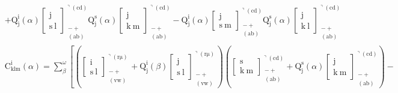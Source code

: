\documentclass[12pt]{article}
\begin{document}
\begin{itemize}
\begin{equation}
\begin{aligned}
    & + \mathrm{Q}^{\mathrm{i}}_{\mathrm{j}}(\alpha) \left[ \begin{matrix} \mathrm{j} \\ \mathrm{s\ l} \end{matrix} \right]^{\urcorner(\mathrm{cd})}_{\substack{- + \\ (\mathrm{ab})}} \mathrm{Q}^{\mathrm{s}}_{\mathrm{j}}(\alpha) \left[ \begin{matrix} \mathrm{j} \\ \mathrm{k\ m} \end{matrix} \right]^{\urcorner(\mathrm{cd})}_{\substack{- + \\ (\mathrm{ab})}} - \mathrm{Q}^{\mathrm{i}}_{\mathrm{j}}(\alpha) \left[ \begin{matrix} \mathrm{j} \\ \mathrm{s\ m} \end{matrix} \right]^{\urcorner(\mathrm{cd})}_{\substack{- + \\ (\mathrm{ab})}} \mathrm{Q}^{\mathrm{s}}_{\mathrm{j}}(\alpha) \left[ \begin{matrix} \mathrm{j} \\ \mathrm{k\ l} \end{matrix} \right]^{\urcorner(\mathrm{cd})}_{\substack{- + \\ (\mathrm{ab})}}
    \end{aligned} \tag{99a}
    \end{equation}
    \begin{equation}
    \begin{aligned}
    & \mathrm{C}^\mathrm{i}_{\mathrm{klm}}(\alpha) = \sum_\beta^\omega \left[ \left( \left[ \begin{smallmatrix} \mathrm{i} \\ \mathrm{s\ l} \end{smallmatrix} \right]^{\urcorner(\mathrm{r\mu})}_{\substack{- + \\ (\mathrm{vw})}} + \mathrm{Q}^\mathrm{i}_\mathrm{j}(\beta) \left[ \begin{smallmatrix} \mathrm{j} \\ \mathrm{s\ l} \end{smallmatrix} \right]^{\urcorner(\mathrm{r\mu})}_{\substack{- + \\ (\mathrm{vw})}} \right) \left( \left[ \begin{smallmatrix} \mathrm{s} \\ \mathrm{k\ m} \end{smallmatrix} \right]^{\urcorner(\mathrm{cd})}_{\substack{- + \\ (\mathrm{ab})}} + \mathrm{Q}^\mathrm{s}_\mathrm{j}(\alpha) \left[ \begin{smallmatrix} \mathrm{j} \\ \mathrm{k\ m} \end{smallmatrix} \right]^{\urcorner(\mathrm{cd})}_{\substack{- + \\ (\mathrm{ab})}} \right) - \right. \nonumber \\

\end{aligned}
\end{equation}
\end{itemize}
\end{document}
